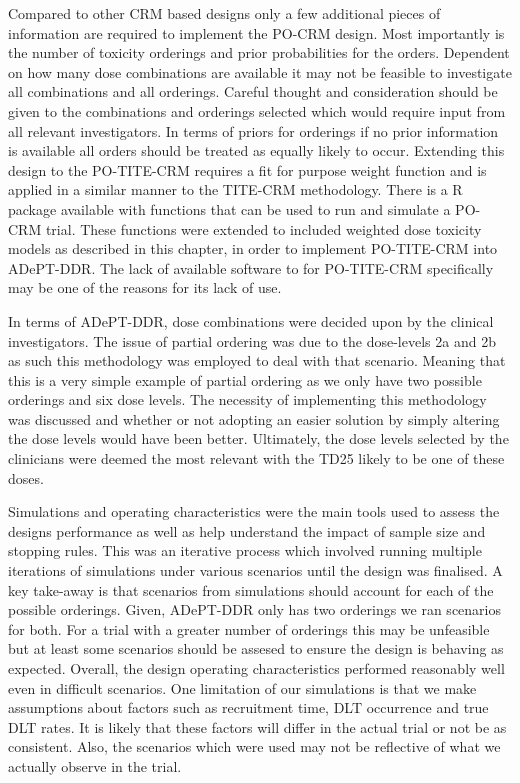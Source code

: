 Compared to other CRM based designs only a few additional pieces of information are required to implement the PO-CRM design. Most importantly is the number of toxicity orderings and prior probabilities for the orders. Dependent on how many dose combinations are available it may not be feasible to investigate all combinations and all orderings. Careful thought and consideration should be given to the combinations and orderings selected which would require input from all relevant investigators. In terms of priors for orderings if no prior information is available all orders should be treated as equally likely to occur. Extending this design to the PO-TITE-CRM requires a fit for purpose weight function and is applied in a similar manner to the TITE-CRM methodology. There is a R package available with functions that can be used to run and simulate a PO-CRM trial. These functions were extended to included weighted dose toxicity models as described in this chapter, in order to implement PO-TITE-CRM into ADePT-DDR. The lack of available software to for PO-TITE-CRM specifically may be one of the reasons for its lack of use.

In terms of ADePT-DDR, dose combinations were decided upon by the clinical investigators. The issue of partial ordering was due to the dose-levels 2a and 2b as such this methodology was employed to deal with that scenario. Meaning that this is a very simple example of partial ordering as we only have two possible orderings and six dose levels. The necessity of implementing this methodology was discussed and whether or not adopting an easier solution by simply altering the dose levels would have been better. Ultimately, the dose levels selected by the clinicians were deemed the most relevant with the TD25 likely to be one of these doses.     
 
Simulations and operating characteristics were the main tools used to assess the designs performance as well as help understand the impact of sample size and stopping rules. This was an iterative process which involved running multiple iterations of simulations under various scenarios until the design was finalised. A key take-away is that scenarios from simulations should account for each of the possible orderings. Given, ADePT-DDR only has two orderings we ran scenarios for both. For a trial with a greater number of orderings this may be unfeasible but at least some scenarios should be assesed to ensure the design is behaving as expected. Overall, the design operating characteristics performed reasonably well even in difficult scenarios. One limitation of our simulations is that we make assumptions about factors such as recruitment time, DLT occurrence and true DLT rates. It is likely that these factors will differ in the actual trial or not be as consistent. Also, the scenarios which were used may not be reflective of what we actually observe in the trial. 

